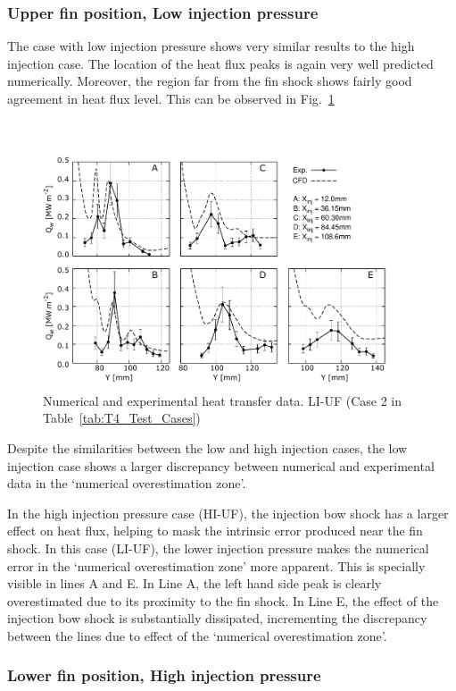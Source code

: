\documentclass{AIAA}
\begin{document}
\subsubsection{Upper fin position, Low injection pressure}

The case with low injection pressure shows very similar results to the high injection case. 
The location of the heat flux peaks is again very well predicted numerically.
Moreover, the region far from the fin shock shows fairly good agreement in heat flux level.
This can be observed in Fig.~\ref{fig:HeatFluxLPLIUF}


\begin{figure}[!h]
\center
\includegraphics[trim = 0mm 3mm 25mm 25mm, clip, width=0.60\columnwidth,valign=t,fbox]{Figures/Data/LP_LI_UF/GNUP_CFD_GaugesLines_Multi.pdf}
\caption{Numerical and experimental heat transfer data. LI-UF (Case 2 in Table~\ref{tab:T4_Test_Cases})}
\label{fig:HeatFluxLPLIUF}
\end{figure} 
%


Despite the similarities between the low and high injection cases, the low injection case shows a larger discrepancy between numerical and experimental data in the `numerical overestimation zone'. 


In the high injection pressure case (HI-UF), the injection bow shock has a larger effect on heat flux, helping to mask the intrinsic error produced near the fin shock.
In this case (LI-UF), the lower injection pressure makes the numerical error in the `numerical overestimation zone' more apparent.
This is specially visible in lines A and E. In Line A, the left hand side peak is clearly overestimated due to its proximity to the fin shock.
In Line E, the effect of the injection bow shock is substantially dissipated, incrementing the discrepancy between the lines due to effect of the `numerical overestimation zone'.


\subsubsection{Lower fin position, High injection pressure}
\end{document}
